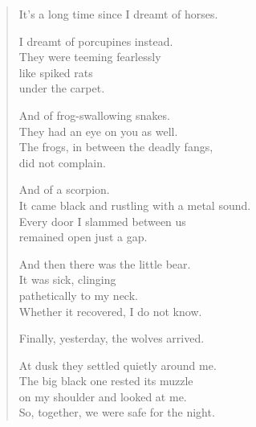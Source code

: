 

\begin{verse}
It's a long time since I dreamt of horses.

I dreamt of porcupines instead.\\
They were teeming fearlessly\\
like spiked rats\\
under the carpet.

And of frog-swallowing snakes.\\
They had an eye on you as well.\\
The frogs, in between the deadly fangs,\\
did not complain.

And of a scorpion.\\
It came black and rustling with a metal sound.\\
Every door I slammed between us\\
remained open just a gap.

And then there was the little bear.\\
It was sick, clinging\\
pathetically to my neck.\\
Whether it recovered, I do not know.

Finally, yesterday, the wolves arrived.

At dusk they settled quietly around me.\\
The big black one rested its muzzle\\
on my shoulder and looked at me.\\
So, together, we were safe for the night.
\end{verse}
